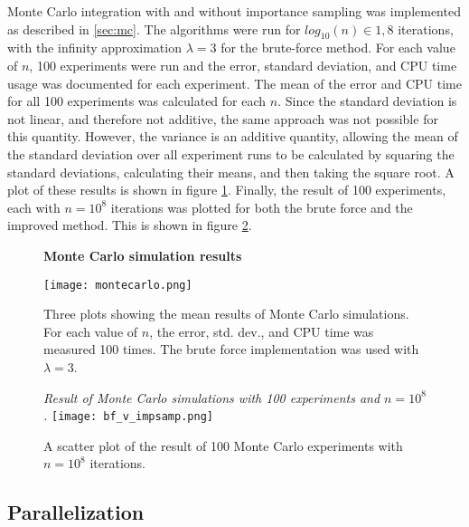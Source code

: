 \documentclass[a4paper,10pt,english]{article}
\begin{document}
Monte Carlo integration with and without importance sampling was implemented as described in \ref{sec:mc}. The algorithms were run for $log_{10}(n) \in {1, 8}$ iterations, with the infinity approximation $\lambda = 3$ for the brute-force method. For each value of $n$, 100 experiments were run and the error, standard deviation, and CPU time usage was documented for each experiment. The mean of the error and CPU time for all 100 experiments was calculated for each $n$. Since the standard deviation is not linear, and therefore not additive, the same approach was not possible for this quantity. However, the variance is an additive quantity, allowing the mean of the standard deviation over all experiment runs to be calculated by squaring the standard deviations, calculating their means, and then taking the square root. A plot of these results is shown in figure \ref{fig:montecarlo}. Finally, the result of 100 experiments, each with $n=10^8$ iterations was plotted for both the brute force and the improved method. This is shown in figure \ref{fig:100_exps}.

\begin{figure}
    \centering
    \textbf{Monte Carlo simulation results}\par\medskip

    \texttt{[image: montecarlo.png]}
    \caption{Three plots showing the mean results of Monte Carlo simulations. For each value of $n$, the error, std. dev., and CPU time was measured 100 times. The brute force implementation was used with $\lambda = 3$.}
    \label{fig:montecarlo}
\end{figure}

\begin{figure}
    \centering
    \textit{Result of Monte Carlo simulations with 100 experiments and $n=10^8$.}
    \texttt{[image: bf\_v\_impsamp.png]}
    \caption{A scatter plot of the result of 100 Monte Carlo experiments with $n=10^8$ iterations. }
    \label{fig:100_exps}
\end{figure}


\subsection{Parallelization}
\end{document}
